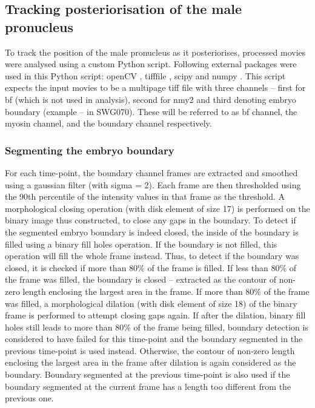 \subsection{Tracking posteriorisation of the male pronucleus}\label{subsec:nucleusTracking}
To track the position of the male pronucleus as it posteriorises, processed movies were analysed using a custom Python script. Following external packages were used in this Python script: openCV \citep{opencv}, tifffile \citep{tifffile}, scipy \citep{scipy} and numpy \citep{numpy}. This script expects the input movies to be a multipage tiff file with three channels -- first for \ac{bf} (which is not used in analysis), second for \ac{nmy2} and third denoting embryo boundary (example --  in SWG070). These will be referred to as \ac{bf} channel, the myosin channel, and the boundary channel respectively.

\subsubsection{Segmenting the embryo boundary}\label{subsubsec:boundaryDetect}
For each time-point, the boundary channel frames are extracted and smoothed using a gaussian filter (with sigma = \SI{2}{\pixels}). Each frame are then thresholded using the 90th percentile of the intensity values in that frame as the threshold. A morphological closing operation (with disk element of size \SI{17}{\pixels}) is performed on the binary image thus constructed, to close any gaps in the boundary. To detect if the segmented embryo boundary is indeed closed, the inside of the boundary is filled using a binary fill holes operation. If the boundary is not filled, this operation will fill the whole frame instead. Thus, to detect if the boundary was closed, it is checked if more than \num{80}\% of the frame is filled. If less than \num{80}\% of the frame was filled, the boundary is closed -- extracted as the contour of non-zero length enclosing the largest area in the frame. If more than \num{80}\% of the frame was filled, a morphological dilation (with disk element of size \SI{18}{\pixels}) of the binary frame is performed to attempt closing gaps again. If after the dilation, binary fill holes still leads to more than \num{80}\% of the frame being filled, boundary detection is considered to have failed for this time-point and the boundary segmented in the previous time-point is used instead. Otherwise, the contour of non-zero length enclosing the largest area in the frame after dilation is again considered as the boundary. Boundary segmented at the previous time-point is also used if the boundary segmented at the current frame has a length too different from the previous one.

